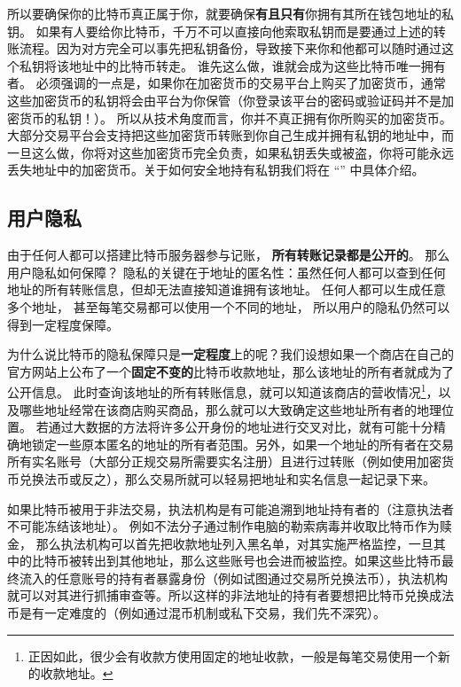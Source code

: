 所以要确保你的比特币真正属于你，就要确保\textbf{有且只有}你拥有其所在钱包地址的私钥。 如果有人要给你比特币，千万不可以直接向他索取私钥而是要通过上述的转账流程。因为对方完全可以事先把私钥备份，导致接下来你和他都可以随时通过这个私钥将该地址中的比特币转走。 谁先这么做，谁就会成为这些比特币唯一拥有者。 必须强调的一点是，如果你在加密货币的交易平台上购买了加密货币，通常这些加密货币的私钥将会由平台为你保管（你登录该平台的密码或验证码并不是加密货币的私钥！）。 所以从技术角度而言，你并不真正拥有你所购买的加密货币。 大部分交易平台会支持把这些加密货币转账到你自己生成并拥有私钥的地址中，而一旦这么做，你将对这些加密货币完全负责，如果私钥丢失或被盗，你将可能永远丢失地址中的加密货币。关于如何安全地持有私钥我们将在 “” 中具体介绍。


\subsection{用户隐私}
由于任何人都可以搭建比特币服务器参与记账， \textbf{所有转账记录都是公开的}。 那么用户隐私如何保障？ 隐私的关键在于地址的匿名性：虽然任何人都可以查到任何地址的所有转账信息，但却无法直接知道谁拥有该地址。 任何人都可以生成任意多个地址， 甚至每笔交易都可以使用一个不同的地址， 所以用户的隐私仍然可以得到一定程度保障。

为什么说比特币的隐私保障只是\textbf{一定程度}上的呢？我们设想如果一个商店在自己的官方网站上公布了一个\textbf{固定不变的}比特币收款地址，那么该地址的所有者就成为了公开信息。 此时查询该地址的所有转账信息，就可以知道该商店的营收情况\footnote{正因如此，很少会有收款方使用固定的地址收款，一般是每笔交易使用一个新的收款地址。}，以及哪些地址经常在该商店购买商品，那么就可以大致确定这些地址所有者的地理位置。 若通过大数据的方法将许多公开身份的地址进行交叉对比，就有可能十分精确地锁定一些原本匿名的地址的所有者范围。另外，如果一个地址的所有者在交易所有实名账号（大部分正规交易所需要实名注册）且进行过转账（例如使用加密货币兑换法币或反之），那么交易所就可以轻易把地址和实名信息一起记录下来。

如果比特币被用于非法交易，执法机构是有可能追溯到地址持有者的（注意执法者不可能冻结该地址）。 例如不法分子通过制作电脑的勒索病毒并收取比特币作为赎金， 那么执法机构可以首先把收款地址列入黑名单，对其实施严格监控，一旦其中的比特币被转出到其他地址，那么这些账号也会进而被监控。如果这些比特币最终流入的任意账号的持有者暴露身份（例如试图通过交易所兑换法币），执法机构就可以对其进行抓捕审查等。所以这样的非法地址的持有者要想把比特币兑换成法币是有一定难度的（例如通过混币机制或私下交易，我们先不深究）。

